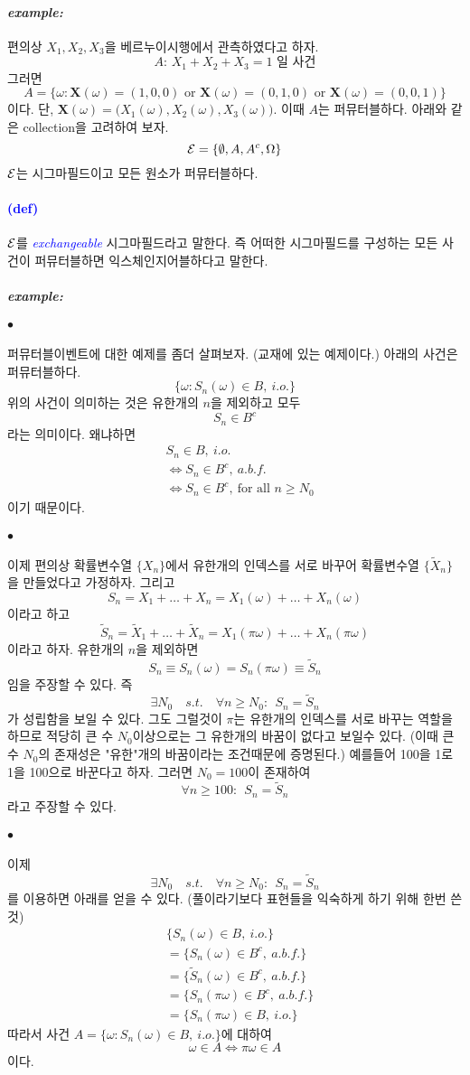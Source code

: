 \documentclass[12pt,oneside,english]{book}
\def\ck{\paragraph{\Large$\bullet$}\Large}
\def\ex{\paragraph{\Large\textit{example:}}\Large}
\newcommand{\parablue}[1]{\paragraph{\Large\textcolor{blue}{(#1)}}\Large}
\newcommand{\bsX}{\mbox{$\boldsymbol{X}$}}
\begin{document}
\ex 편의상 $X_1,X_2,X_3$을 베르누이시행에서 관측하였다고 하자. 
\[
\mbox{$A$: $X_1+X_2+X_3=1$ 일 사건} 
\]
그러면 
\[
A=\{\omega: \bsX(\omega)=(1,0,0) \mbox{ or } \bsX(\omega)=(0,1,0) \mbox{ or } \bsX(\omega)=(0,0,1)\}
\]
이다. 단, $\bsX(\omega)=\big(X_1(\omega),X_2(\omega),X_3(\omega)\big)$. 이때 $A$는 퍼뮤터블하다. 아래와 같은 collection을 고려하여 보자. 
\[
{\cal E}=\{\emptyset,A,A^c,\Omega \}
\]
$\cal E$는 시그마필드이고 모든 원소가 퍼뮤터블하다. 

\parablue{def} ${\cal E}$를 \emph{\textcolor{blue}{exchangeable}} 시그마필드라고 말한다. 즉 어떠한 시그마필드를 구성하는 모든 사건이 퍼뮤터블하면 익스체인지어블하다고 말한다. 

\ex 
\ck 
퍼뮤터블이벤트에 대한 예제를 좀더 살펴보자. (교재에 있는 예제이다.) 아래의 사건은 퍼뮤터블하다. 
\[
\{\omega:S_n(\omega) \in B, ~i.o.\}
\]
위의 사건이 의미하는 것은 유한개의 $n$을 제외하고 모두 
\[
S_n \in B^c
\]
라는 의미이다. 왜냐하면 
\begin{align*}
& S_n \in B, ~i.o. \\
& \Longleftrightarrow S_n \in B^c, ~ a.b.f. \\ 
& \Longleftrightarrow S_n \in B^c, ~ \mbox{for all } n\geq N_0
\end{align*}
이기 때문이다. 

\ck 이제 편의상 확률변수열 $\{X_n\}$에서 유한개의 인덱스를 서로 바꾸어 확률변수열 $\{\tilde{X}_n\}$을 만들었다고 가정하자. 그리고 
\[
S_n=X_1+\dots+X_n=X_1(\omega)+\dots+X_n(\omega)
\]
이라고 하고 
\[
\tilde{S}_n=\tilde{X}_1+\dots+\tilde{X}_n=X_1(\pi\omega)+\dots+X_n(\pi\omega) 
\]
이라고 하자. 유한개의 $n$을 제외하면 
\[
S_n\equiv S_n(\omega)=S_n(\pi\omega)\equiv \tilde{S}_n
\]
임을 주장할 수 있다. 즉 
\[
\exists N_0 \quad s.t. \quad \forall n \geq N_0: ~~ S_n=\tilde{S}_n
\]
가 성립함을 보일 수 있다. 그도 그럴것이 $\pi$는 유한개의 인덱스를 서로 바꾸는 역할을 하므로 적당히 큰 수 $N_0$이상으로는 그 유한개의 바꿈이 없다고 보일수 있다. (이때 큰 수 $N_0$의 존재성은 "유한"개의 바꿈이라는 조건때문에 증명된다.) 예를들어 100을 1로 1을 100으로 바꾼다고 하자. 그러면 $N_0=100$이 존재하여 
\[
\forall n \geq 100: ~~ S_n=\tilde{S}_n
\]
라고 주장할 수 있다. 

\ck 이제 
\[
\exists N_0 \quad s.t. \quad \forall n \geq N_0: ~~ S_n=\tilde{S}_n
\]
를 이용하면 아래를 얻을 수 있다. (풀이라기보다 표현들을 익숙하게 하기 위해 한번 쓴 것)
\begin{align*}
& \{S_n(\omega) \in B, ~i.o.\} \\
& =\{S_n(\omega) \in B^c, ~a.b.f.\} \\ 
& =\{\tilde{S}_n(\omega) \in B^c, ~a.b.f.\} \\ 
& =\{S_n(\pi\omega) \in B^c, ~a.b.f.\} \\ 
& =\{S_n(\pi\omega) \in B, ~i.o.\}
\end{align*}
따라서 사건 $A=\{\omega:S_n(\omega) \in B, ~i.o.\}$에 대하여 
\[
\omega \in A \Longleftrightarrow \pi\omega \in A
\]
이다. 
\end{document}
